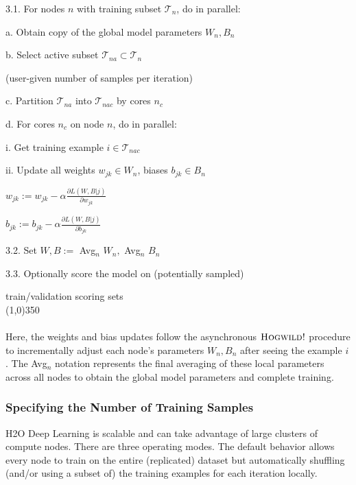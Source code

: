 \hspace{1cm} 3.1. For nodes $n$ with training subset $\mathcal{T}_n$, do in parallel:

\hspace{2cm}  a. Obtain copy of the global model parameters $W_n, B_n$

\hspace{2cm}  b. Select active subset $\mathcal{T}_{na} \subset \mathcal{T}_n$ 

\hspace{2.5cm} (user-given number of samples per iteration)

\hspace{2cm}  c. Partition $\mathcal{T}_{na}$ into $\mathcal{T}_{nac}$ by cores $n_c$

\hspace{2cm}  d. For cores $n_c$ on node $n$, do in parallel:

\hspace{3cm}  i. Get training example $i \in \mathcal{T}_{nac}$

\hspace{3cm}  ii. Update all weights $w_{jk} \in W_n$, biases $b_{jk} \in B_n$

\hspace{4cm}  $w_{jk} := w_{jk} - \alpha \frac{\partial L(W,B | j)}{\partial w_{jk}}$

\hspace{4cm} $b_{jk} := b_{jk} - \alpha \frac{\partial L(W,B | j)}{\partial b_{jk}}$

\hspace{1cm} 3.2. Set $W,B := $ Avg$_n$ $W_n,$ $ $Avg$_n$ $B_n$

\hspace{1cm} 3.3. Optionally score the model on (potentially sampled) 

\hspace{1.8cm} train/validation scoring sets
\\
\line(1,0){350}
\\
\\
Here, the weights and bias updates follow the asynchronous  $\textsc{Hogwild!}$ procedure to incrementally adjust each node's parameters $W_n,B_n$ after seeing the example $i$. The Avg$_n$ notation represents the final averaging of these local parameters across all nodes to obtain the global model parameters and complete training.

\subsubsection{Specifying the Number of Training Samples} 
\label{sssec:TrainSamplesPerIter}
H2O Deep Learning is scalable and can take advantage of large clusters of compute nodes. There are three operating modes.
The default behavior allows every node to train on the entire (replicated) dataset but automatically  shuffling (and/or using a subset of) the training examples for each iteration locally. 

